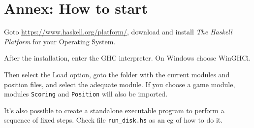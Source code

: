 \documentclass[a4paper,12pt]{article}
\begin{document}
\newpage \section{Annex: How to start}

Goto \url{https://www.haskell.org/platform/}, download and install \textit{The Haskell Platform} 
for your Operating System.

After the installation, enter the GHC interpreter. On Windows choose WinGHCi. 

Then select the Load option, goto the folder with the current modules and position files,
and select the adequate module. If you choose a game module, modules \verb!Scoring! and
\verb!Position! will also be imported.

It's also possible to create a standalone executable program to perform a sequence of fixed steps. 
Check file \verb!run_disk.hs! as an eg of how to do it.
\end{document}
